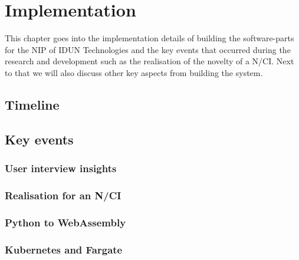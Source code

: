 \chapter{Implementation}
\graphicspath{{Chapter4/Figs/}{Chapter4/Figs/}}

This chapter goes into the implementation details of building the software-parts for the NIP of IDUN Technologies and the key events that occurred during the research and development such as the realisation of the novelty of a N/CI. Next to that we will also discuss other key aspects from building the system.

\section{Timeline}
\label{chapter4-timeline}

\section{Key events}
\label{chapter4-key-events}

\subsection{User interview insights}
\label{chapter4-user-interview-insights}

\subsection{Realisation for an N/CI}
\label{chapter4-realisation-for-an-nci}

\subsection{Python to WebAssembly}
\label{chapter4-python-to-webassembly}

\subsection{Kubernetes and Fargate}
\label{chapter4-kubernetes-and-aws-fargate}


